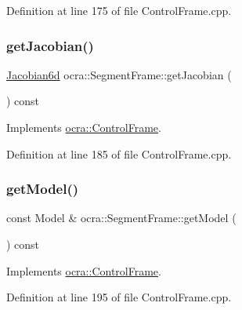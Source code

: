 Definition at line 175 of file Control\+Frame.\+cpp.

\hypertarget{classocra_1_1SegmentFrame_a1ece38dd51a3331dfe3de7911ad9291e}{}\label{classocra_1_1SegmentFrame_a1ece38dd51a3331dfe3de7911ad9291e} 
\subsubsection{\texorpdfstring{get\+Jacobian()}{getJacobian()}}
{\footnotesize\ttfamily \hyperlink{namespaceocra_ac73b015f9f7cb0c252c4d5c4800f559a}{Jacobian6d} ocra\+::\+Segment\+Frame\+::get\+Jacobian (\begin{DoxyParamCaption}{ }\end{DoxyParamCaption}) const\hspace{0.3cm}{\ttfamily [virtual]}}



Implements \hyperlink{classocra_1_1ControlFrame_a14e0b855979be5dbd360314f25191e77}{ocra\+::\+Control\+Frame}.



Definition at line 185 of file Control\+Frame.\+cpp.

\hypertarget{classocra_1_1SegmentFrame_a3a14b77753ad98507db9968b33c582e4}{}\label{classocra_1_1SegmentFrame_a3a14b77753ad98507db9968b33c582e4} 
\subsubsection{\texorpdfstring{get\+Model()}{getModel()}}
{\footnotesize\ttfamily const Model \& ocra\+::\+Segment\+Frame\+::get\+Model (\begin{DoxyParamCaption}{ }\end{DoxyParamCaption}) const\hspace{0.3cm}{\ttfamily [virtual]}}



Implements \hyperlink{classocra_1_1ControlFrame_ab8a1e5e3d96d7524112b4c88bf0bc5ee}{ocra\+::\+Control\+Frame}.



Definition at line 195 of file Control\+Frame.\+cpp.

\hypertarget{classocra_1_1SegmentFrame_ad0c5aa3b15b384cd5a4774ddd534b32e}{}\label{classocra_1_1SegmentFrame_ad0c5aa3b15b384cd5a4774ddd534b32e} 
